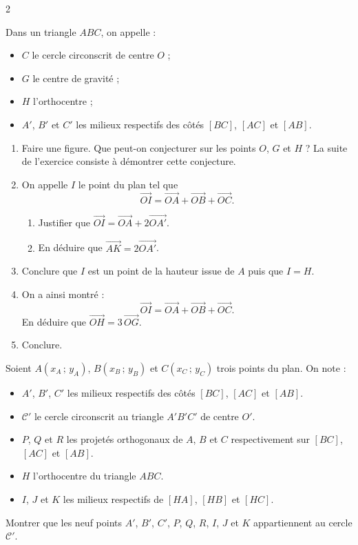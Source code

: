 \documentclass[a4paper,12pt]{article}
\begin{document}
\begin{multicols}{2}
\begin{exercice}[title=Exercice 23 $\star\star\star$ { [Raisonner, Chercher, Représenter] }]{}{}
  Dans un triangle $ABC$, on appelle :
  \begin{itemize}
    \item $C$ le cercle circonscrit de centre $O$ ;
    \item $G$ le centre de gravité ;
    \item $H$ l'orthocentre ;
    \item $A'$, $B'$ et $C'$ les milieux respectifs des côtés $[BC]$, $[AC]$ et $[AB]$.
  \end{itemize}
  \begin{enumerate}
    \item Faire une figure. Que peut-on conjecturer sur les points $O$, $G$ et $H$ ? La suite de l'exercice consiste à démontrer cette conjecture.
    \item On appelle $I$ le point du plan tel que
      $$\overrightarrow{OI} = \overrightarrow{OA} + \overrightarrow{OB} + \overrightarrow{OC}.$$
      \begin{enumerate}
        \item[(a)] Justifier que $\overrightarrow{OI} = \overrightarrow{OA} + 2\overrightarrow{OA'}$.
        \item[(b)] En déduire que $\overrightarrow{AK} = 2\overrightarrow{OA'}$.
      \end{enumerate}
    \item Conclure que $I$ est un point de la hauteur issue de $A$ puis que $I = H$.
    \item On a ainsi montré :
      $$\overrightarrow{OI} = \overrightarrow{OA} + \overrightarrow{OB} + \overrightarrow{OC}.$$
      En déduire que $\overrightarrow{OH} = 3\,\overrightarrow{OG}.$
    \item Conclure.
  \end{enumerate}
\end{exercice}

\begin{exercice}[title=Exercice 24 $\star\star\star$ { [Raisonner, Chercher, Représenter] }]{}{}
  Soient $A(x_A\,;\,y_A)$, $B(x_B\,;\,y_B)$ et $C(x_C\,;\,y_C)$ trois points du plan. On note :
  \begin{itemize}
    \item $A'$, $B'$, $C'$ les milieux respectifs des côtés $[BC]$, $[AC]$ et $[AB]$.
    \item $\mathcal{C}'$ le cercle circonscrit au triangle $A'B'C'$ de centre $O'$.
    \item $P$, $Q$ et $R$ les projetés orthogonaux de $A$, $B$ et $C$ respectivement sur $[BC]$, $[AC]$ et $[AB]$.
    \item $H$ l'orthocentre du triangle $ABC$.
    \item $I$, $J$ et $K$ les milieux respectifs de $[HA]$, $[HB]$ et $[HC]$.
  \end{itemize}
  Montrer que les neuf points $A'$, $B'$, $C'$, $P$, $Q$, $R$, $I$, $J$ et $K$ appartiennent au cercle $\mathcal{C}'$.
\end{exercice}

\end{multicols}
\end{document}
